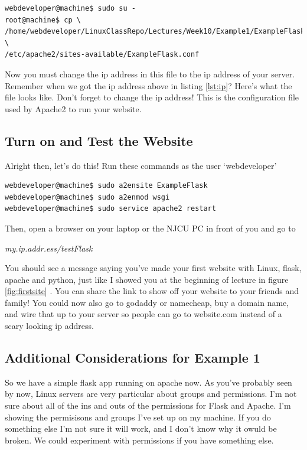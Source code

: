 \documentclass[10pt]{article}
\begin{document}
\begin{lstlisting}[style=term, caption=Get the configuration file]
webdeveloper@machine$ sudo su -
root@machine$ cp \
/home/webdeveloper/LinuxClassRepo/Lectures/Week10/Example1/ExampleFlask.conf \
/etc/apache2/sites-available/ExampleFlask.conf
\end{lstlisting}

Now you must change the ip address in this file to the ip address of your
server. Remember when we got the ip address above in listing \ref{lst:ip}?
Here's what the file looks like. Don't forget to change the ip address! This is
the configuration file used by Apache2 to run your website.



\subsection{Turn on and Test the Website}
Alright then, let's do this! Run these commands as the user `webdeveloper'
\begin{lstlisting}[style=term]
webdeveloper@machine$ sudo a2ensite ExampleFlask
webdeveloper@machine$ sudo a2enmod wsgi
webdeveloper@machine$ sudo service apache2 restart
\end{lstlisting}

Then, open a browser on your laptop or the NJCU PC in front of you and go to 

\begin{center}
\textit{my.ip.addr.ess/testFlask}
\end{center}

You should see a message saying you've made your first website with Linux,
flask, apache and python, just like I showed you at the beginning of lecture in
figure \ref{fig:firstsite} . You can share the link to show off your website to your friends and family! You could now also go to godaddy or namecheap, buy a domain name, and wire that up to your server so people can go to website.com instead of a scary looking ip address.

\subsection{Additional Considerations for Example 1}
So we have a simple flask app running on apache now. As you've probably seen by now, Linux servers are very particular about groups and permissions. I'm not sure about all of the ins and outs of the permissions for Flask and Apache. I'm showing the permisisons and groups I've set up on my machine. If you do something else I'm not sure it will work, and I don't know why it owuld be broken. We could experiment with permissions if you have something else.
\end{document}
